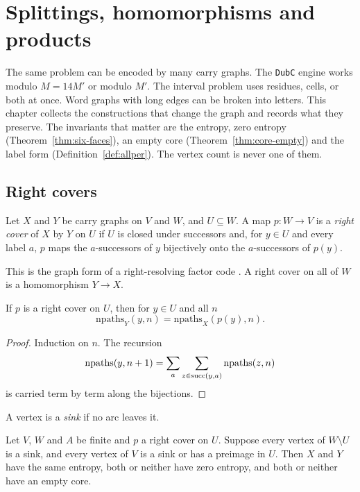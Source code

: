 \chapter{Splittings, homomorphisms and products}\label{ch:splitting}

The same problem can be encoded by many carry graphs. The \texttt{DubC} engine works modulo
\(M=14M'\) or modulo \(M'\). The interval problem uses residues, cells, or both at once. Word
graphs with long edges can be broken into letters. This chapter collects the constructions that
change the graph and records what they preserve. The invariants that matter are the entropy,
zero entropy (Theorem~\ref{thm:six-faces}), an empty core (Theorem~\ref{thm:core-empty}) and
the label form (Definition~\ref{def:allper}). The vertex count is never one of them.

\section{Right covers}

\begin{definition}\label{def:rightcover}
Let \(X\) and \(Y\) be carry graphs on \(V\) and \(W\), and \(U\subseteq W\). A map
\(p\colon W\to V\) is a \emph{right cover} of \(X\) by \(Y\) on \(U\) if \(U\) is closed under
successors and, for \(y\in U\) and every label \(a\), \(p\) maps the \(a\)-successors of \(y\)
bijectively onto the \(a\)-successors of \(p(y)\).
\end{definition}

This is the graph form of a right-resolving factor code \cite[§8.2]{LM95}. A right cover on all
of \(W\) is a homomorphism \(Y\to X\).

\begin{proposition}\label{prop:rightcover-paths}
If \(p\) is a right cover on \(U\), then for \(y\in U\) and all \(n\)
\[
\mathrm{npaths}_Y(y,n)=\mathrm{npaths}_X(p(y),n).
\]
\end{proposition}

\begin{proof}
Induction on \(n\). The recursion
\[
\mathrm{npaths}(y,n+1)=\sum_a\sum_{z\in\operatorname{succ}(y,a)}\mathrm{npaths}(z,n)
\]
is carried term by term along the bijections.
\end{proof}

A vertex is a \emph{sink} if no arc leaves it.

\begin{theorem}\label{thm:rightcover}
Let \(V\), \(W\) and \(A\) be finite and \(p\) a right cover on \(U\). Suppose every vertex of
\(W\setminus U\) is a sink, and every vertex of \(V\) is a sink or has a preimage in \(U\). Then
\(X\) and \(Y\) have the same entropy, both or neither have zero entropy, and both or neither
have an empty core.
\end{theorem}

